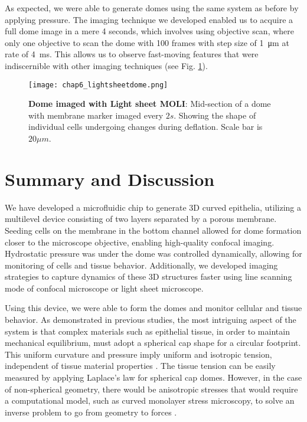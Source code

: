 As expected, we were able to generate domes using the same system as before by applying pressure. The imaging technique we developed enabled us to acquire a full dome image in a mere 4 seconds, which involves using objective scan, where only one objective to scan the dome with 100 frames with step size of 1~\unit{\um} at rate of 4~\unit{\ms}. This allows us to observe fast-moving features that were indiscernible with other imaging techniques (see Fig. \ref{fig_6_9}).

\begin{figure}[]
	\centering
	\texttt{[image: chap6\_lightsheetdome.png]}
	\caption{ \textbf{Dome imaged with Light sheet MOLI}: Mid-section of a dome with membrane marker imaged every $2s$. Showing the shape of individual cells undergoing changes during deflation. Scale bar is $20 \mu m$.
	}\label{fig_6_9}
\end{figure}

\hypertarget{summary-and-discussion}{%
\section{Summary and Discussion}\label{summary-and-discussion}}

We have developed a microfluidic chip to generate 3D curved epithelia, utilizing a multilevel device consisting of two layers separated by a porous membrane. Seeding cells on the membrane in the bottom channel allowed for dome formation closer to the microscope objective, enabling high-quality confocal imaging. Hydrostatic pressure was under the dome was controlled dynamically, allowing for monitoring of cells and tissue behavior. Additionally, we developed imaging strategies to capture dynamics of these 3D structures faster using line scanning mode of confocal microscope or light sheet microscope.

Using this device, we were able to form the domes and monitor cellular and tissue behavior. As demonstrated in previous studies, the most intriguing aspect of the system is that complex materials such as epithelial tissue, in order to maintain mechanical equilibrium, must adopt a spherical cap shape for a circular footprint. This uniform curvature and pressure imply uniform and isotropic tension, independent of tissue material properties \cite{latorre2018,marin-llaurado2022}. The tissue tension can be easily measured by applying Laplace's law for spherical cap domes. However, in the case of non-spherical geometry, there would be anisotropic stresses that would require a computational model, such as curved monolayer stress microscopy, to solve an inverse problem to go from geometry to forces \cite{marin-llaurado2022}.  


